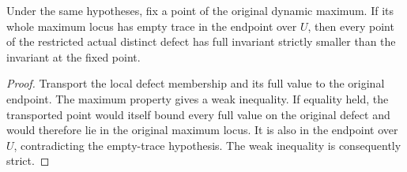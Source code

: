 \begin{theorem}
\label{hir:sharp-original-current-value-below-omitted-maximum}
\leanok
Under the same hypotheses, fix a point of the original dynamic maximum. If
its whole maximum locus has empty trace in the endpoint over $U$, then every
point of the restricted actual distinct defect has full invariant strictly
smaller than the invariant at the fixed point.
\end{theorem}
\begin{proof}
Transport the local defect membership and its full value to the original
endpoint. The maximum property gives a weak inequality. If equality held,
the transported point would itself bound every full value on the original
defect and would therefore lie in the original maximum locus. It is also in
the endpoint over $U$, contradicting the empty-trace hypothesis. The weak
inequality is consequently strict.
\end{proof}
